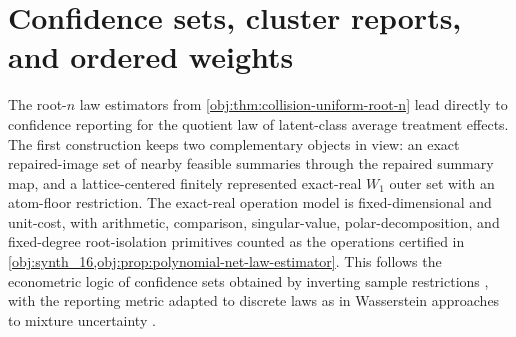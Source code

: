 \section{Confidence sets, cluster reports, and ordered weights}

The root-\(n\) law estimators from \cref{obj:thm:collision-uniform-root-n} lead directly to confidence reporting for the quotient law of latent-class average treatment effects. The first construction keeps two complementary objects in view: an exact repaired-image set of nearby feasible summaries through the repaired summary map, and a lattice-centered finitely represented exact-real \(W_1\) outer set with an atom-floor restriction. The exact-real operation model is fixed-dimensional and unit-cost, with arithmetic, comparison, singular-value, polar-decomposition, and fixed-degree root-isolation primitives counted as the operations certified in \cref{obj:synth_16,obj:prop:polynomial-net-law-estimator}. This follows the econometric logic of confidence sets obtained by inverting sample restrictions \citep{RobinsVanDerVaart2006}, with the reporting metric adapted to discrete laws as in Wasserstein approaches to mixture uncertainty \citep{DeoRandrianarisoa2023}.

